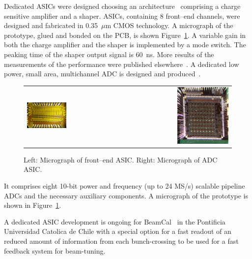 Dedicated ASICs were designed choosing
an
architecture~\cite{Boie1982365,Gatti:1986qq}
comprising a charge sensitive amplifier and a shaper.
ASICs, containing 8 front--end channels, were designed and fabricated in 0.35~$\mu$m CMOS technology.
A micrograph of the prototype, glued and bonded on the PCB, is shown Figure~\ref{fig:frontend_photo}.
A variable gain in both the charge amplifier and
the shaper is implemented by a mode switch. The peaking time of the shaper output signal is 60~ns.
More results of the measurements of the performance were published elsewhere~\cite{4600902}.
A dedicated low power, small area, multichannel ADC is designed and produced~\cite{6156491}.
\begin{figure}[htbp]
\begin{center}
 \begin{tabular}{rrr}
    \includegraphics[width=0.4\columnwidth]{Calorimeter/FCAL/figs/fcal_lumical_fe_photo}
     &~~~~~~&
 \includegraphics[width=0.4\textwidth,height=0.28\textwidth]{Calorimeter/FCAL/figs/adc_asic_photo.png} \\

\end{tabular}
   \end{center}
          \caption{Left: Micrograph of front--end ASIC.
               Right: Micrograph of ADC ASIC.}
    \label{fig:frontend_photo}
\end{figure}
It comprises eight 10-bit power and frequency (up to 24 MS/s) scalable pipeline ADCs and the necessary
auxiliary components.
A micrograph of the prototype is shown in Figure~\ref{fig:frontend_photo}.

A dedicated ASIC development is ongoing for BeamCal~\cite{6200898}
in the Pontificia Universidad Catolica de Chile with a special option for a fast readout of an reduced amount of
information from each bunch-crossing to be used for a fast feedback system for beam-tuning.

